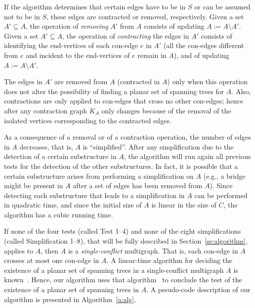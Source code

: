 \documentclass[letter,runningheads]{llncs}
\begin{document}
If the algorithm determines that certain edges have to be in $S$ or can be assumed not to be in $S$, these edges are contracted or removed, respectively. Given a set $A'\subseteq A$, the operation of {\em removing} $A'$ from $A$ consists of updating $A:=A\setminus A'$. Given a set $A'\subseteq A$, the operation of {\em contracting} the edges in $A'$ consists of identifying the end-vertices of each con-edge $e$ in $A'$ (all the con-edges different from $e$ and incident to the end-vertices of $e$ remain in $A$), and of updating $A:=A\setminus A'$.

The edges in $A'$ are removed from $A$ (contracted in $A$) only when this operation does not alter the possibility of finding a planar set of spanning trees for $A$. Also, contractions are only applied to con-edges that cross no other con-edges; hence after any contraction graph $K_A$ only changes because of the removal of the isolated vertices corresponding to the contracted edges.

As a consequence of a removal or of a contraction operation, the number of edges in $A$ decreases, that is, $A$ is ``simplified''. After any simplification due to the detection of a certain substructure in $A$, the algorithm will run again all previous tests for the detection of the other substructures. In fact, it is possible that a certain substructure arises from performing a simplification on $A$ (e.g., a bridge might be present in $A$ after a set of edges has been removed from $A$). Since detecting each substructure that leads to a simplification in $A$ can be performed in quadratic time, and since the initial size of $A$ is linear in the size of $C$, the algorithm has a cubic running time.

If none of the four tests (called {\sc Test 1--4}) and none of the eight simplifications (called {\sc Simplification 1--8}), that will be fully described in Section~\ref{se:algorithm}, applies to $A$, then $A$ is a {\em single-conflict} multigraph. That is, each con-edge in $A$ crosses at most one con-edge in $A$. A linear-time algorithm for deciding the existence of a planar set of spanning trees in a single-conflict multigraph $A$ is known~\cite{df-ectefcgsf-09}. Hence, our algorithm uses that algorithm~\cite{df-ectefcgsf-09} to conclude the test of the existence of a planar set of spanning trees in $A$. A pseudo-code description of our algorithm is presented in Algorithm~\ref{a:alg}.
\end{document}
